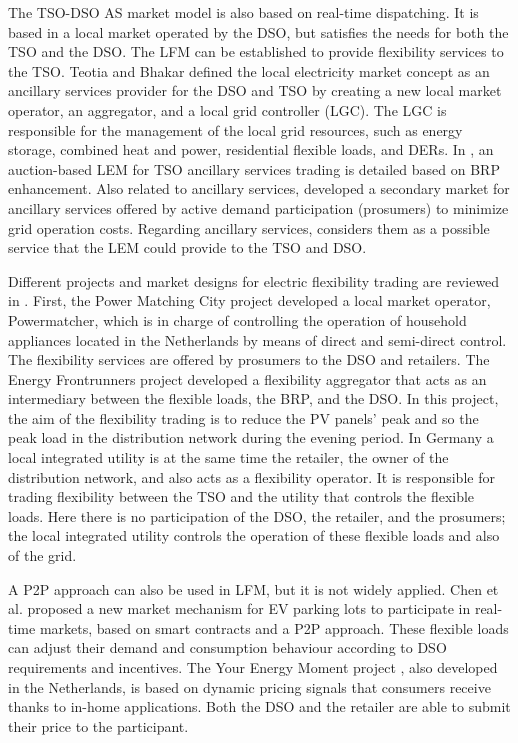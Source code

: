 The TSO-DSO AS market model is also based on real-time dispatching. It is based in a local market operated by the DSO, but satisfies the needs for both the TSO and the DSO. The LFM can be established to provide flexibility services to the TSO. Teotia and Bhakar \cite{teotia2016local} defined the local electricity market concept as an ancillary services provider for the DSO and TSO by creating a new local market operator, an aggregator, and a local grid controller (LGC). The LGC is responsible for the management of the local grid resources, such as energy storage, combined heat and power, residential flexible loads, and DERs. In \cite{rosen2013auction}, an auction-based LEM for TSO ancillary services trading is detailed based on BRP enhancement. Also related to ancillary services, \cite{martinez2013active} developed a secondary market for ancillary services offered by active demand participation (prosumers) to minimize grid operation costs. Regarding ancillary services, \cite{menniti2014future} considers them as a possible service that the LEM could provide to the TSO and DSO.

Different projects and market designs for electric flexibility trading are reviewed in \cite{eid2016market}. First, the Power Matching City project developed a local market operator, Powermatcher, which is in charge of controlling the operation of household appliances located in the Netherlands by means of direct and semi-direct control. 
The flexibility services are offered by prosumers to the DSO and retailers. The Energy Frontrunners project developed a flexibility aggregator that acts as an intermediary between the flexible loads, the BRP, and the DSO. In this project, the aim of the flexibility trading is to reduce the PV panels' peak and so the peak load in the distribution network during the evening period. In Germany a local integrated utility is at the same time the retailer, the owner of the distribution network, and also acts as a flexibility operator. It is responsible for trading flexibility between the TSO and the utility that controls the flexible loads. Here there is no participation of the DSO, the retailer, and the prosumers; the local integrated utility controls the operation of these flexible
loads and also of the grid.

A P2P approach can also be used in LFM, but it is not widely applied. Chen et al. \cite{chen2017integrated} proposed a new market mechanism for EV parking lots to participate in real-time markets, based on smart contracts and a P2P approach. These flexible loads can adjust their demand and consumption behaviour according to DSO requirements and incentives. The Your Energy Moment project \cite{eid2016market}, also developed in the Netherlands, is based on dynamic pricing signals that consumers receive thanks to in-home applications. Both the DSO and the retailer are able to submit their price to the participant.

